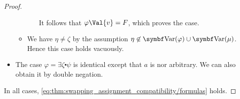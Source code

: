 \begin{proof}
\begin{itemize}
\begin{itemize}
\begin{itemize}
        It follows that \( \varphi\Val{v} = F \), which proves the case.
      \end{itemize}

      \item We have \( \eta \neq \zeta \) by the assumption \( \eta \not\in \Bold{Var}(\varphi) \cup \Bold{Var}(\mu) \). Hence this case holds vacuously.
    \end{itemize}

    \item The case \( \varphi = \exists \zeta \centerdot \psi \) is identical except that \( a \) is nor arbitrary. We can also obtain it by double negation.
  \end{itemize}

  In all cases, \eqref{eq:thm:swapping_assignment_compatibility/formulas} holds.
\end{proof}

